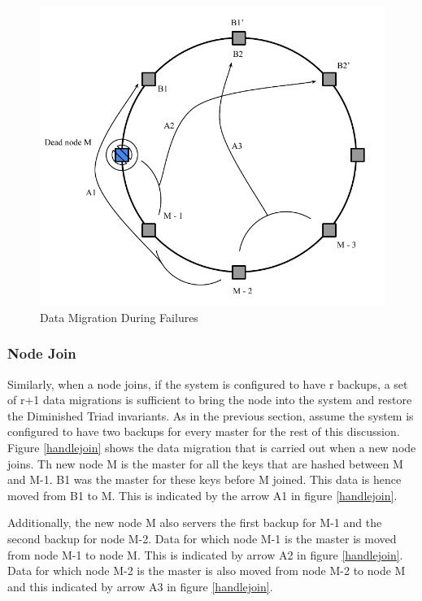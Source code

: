 \documentclass[10pt,twocolumn,letterpaper]{article}
\begin{document}
\begin{figure}[hbt]
  \centering
  \includegraphics[scale=0.6]{handle_dead.pdf}
  \caption{Data Migration During Failures}
  \label{handledead}
\end{figure}

\subsubsection{Node Join} Similarly, when a node joins, if the system is configured to have r backups,  a set of r+1 data migrations is sufficient to bring the node into the system and restore the Diminished Triad invariants. As in the previous section, assume the system is configured to have two backups for every master for the rest of this discussion. Figure \ref{handlejoin} shows the data migration that is carried out when a new node joins. Th new node M is the master for all the keys that are hashed between M and M-1. B1 was the master for these keys before M joined. This data is hence moved from B1 to M. This is indicated by the arrow A1 in figure \ref{handlejoin}. 

Additionally, the new node M also servers the first backup for M-1 and the second backup for node M-2. Data for which node M-1 is the master is moved from node M-1 to node M. This is indicated by arrow A2 in figure \ref{handlejoin}. Data for which node M-2 is the master is also moved from node M-2 to node M and this indicated by arrow A3 in figure \ref{handlejoin}.
\end{document}
